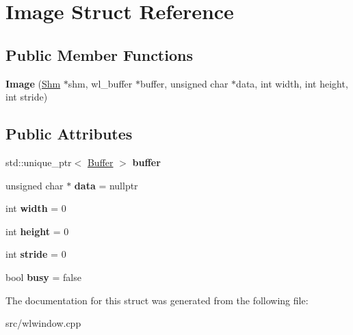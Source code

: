 \hypertarget{structImage}{}\section{Image Struct Reference}
\label{structImage}
\subsection*{Public Member Functions}
\begin{DoxyCompactItemize}
\item 
\mbox{\label{structImage_a24ea3bd91753fe3fecda513112eee8fc}} 
{\bfseries Image} (\mbox{\hyperlink{classShm}{Shm}} $\ast$shm, wl\+\_\+buffer $\ast$buffer, unsigned char $\ast$data, int width, int height, int stride)
\end{DoxyCompactItemize}
\subsection*{Public Attributes}
\begin{DoxyCompactItemize}
\item 
\mbox{\label{structImage_a2f714a2e9effce466defd27160d515c6}} 
std\+::unique\+\_\+ptr$<$ \mbox{\hyperlink{classBuffer}{Buffer}} $>$ {\bfseries buffer}
\item 
\mbox{\label{structImage_a22b726c8306f78b5022e0670ddb0937f}} 
unsigned char $\ast$ {\bfseries data} = nullptr
\item 
\mbox{\label{structImage_ab8d12f635013c04159cd4d3d972bac88}} 
int {\bfseries width} = 0
\item 
\mbox{\label{structImage_a51df43db420c9c0b57536cb2dd36de5c}} 
int {\bfseries height} = 0
\item 
\mbox{\label{structImage_a80f4b6e9a4e2f962ec21dc66f739caed}} 
int {\bfseries stride} = 0
\item 
\mbox{\label{structImage_aa50570263edd8c3a1ba9f9dfb8c23b75}} 
bool {\bfseries busy} = false
\end{DoxyCompactItemize}


The documentation for this struct was generated from the following file\+:\begin{DoxyCompactItemize}
\item 
src/wlwindow.\+cpp\end{DoxyCompactItemize}
